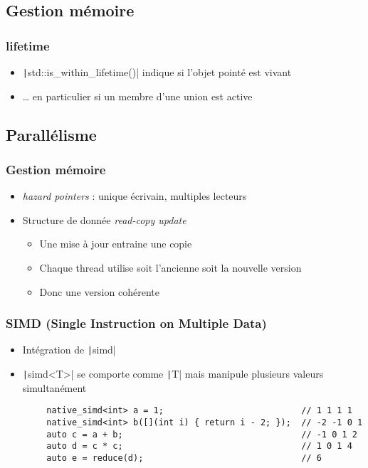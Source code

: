 \documentclass[C++.tex]{subfiles}
\begin{document}
\subsection*{Gestion mémoire}
\begin{frame}[fragile]
	\frametitle{lifetime}
	\begin{itemize}
		\item \texttt|std::is_within_lifetime()| indique si l'objet pointé est vivant
		\item \ldots{} en particulier si un membre d'une union est active
	\end{itemize}

\end{frame}

\subsection*{Parallélisme}
\begin{frame}[fragile]
	\frametitle{Gestion mémoire}
	\begin{itemize}
		\item \textit{hazard pointers} : unique écrivain, multiples lecteurs
		\item Structure de donnée \textit{read-copy update}
		\begin{itemize}
			\item Une mise à jour entraine une copie
			\item Chaque thread utilise soit l'ancienne soit la nouvelle version
			\item Donc une version cohérente
		\end{itemize}
	\end{itemize}

\end{frame}

\begin{frame}[fragile]
	\frametitle{SIMD (Single Instruction on Multiple Data)}
	\begin{itemize}
		\item Intégration de \texttt|simd|
		\item \texttt|simd<T>| se comporte comme \texttt|T| mais manipule plusieurs valeurs simultanément
	\end{itemize}

	\begin{verbatim}
		native_simd<int> a = 1;                           // 1 1 1 1
		native_simd<int> b([](int i) { return i - 2; });  // -2 -1 0 1
		auto c = a + b;                                   // -1 0 1 2
		auto d = c * c;                                   // 1 0 1 4
		auto e = reduce(d);                               // 6
	\end{verbatim}

\end{frame}
\end{document}
